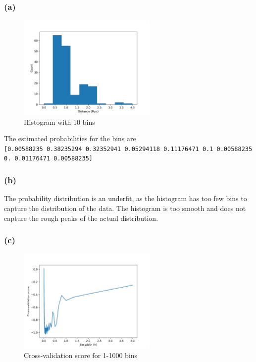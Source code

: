\subsubsection*{(a)}
\vspace{-30pt}
\begin{figure}[H]
	\centering
	\includegraphics[width=0.6\textwidth]{images/10binhistogram.png}
	\caption{Histogram with 10 bins}
\end{figure}
The estimated probabilities for the bins are\\
\texttt{[0.00588235 0.38235294 0.32352941 0.05294118 0.11176471 0.1
			0.00588235 0.         0.01176471 0.00588235]}

\subsubsection*{(b)}
The probability distribution is an underfit, as the histogram has too few bins to capture the distribution of the data. The histogram is too smooth and does not capture the rough peaks of the actual distribution.

\subsubsection*{(c)}
\vspace{-30pt}
\begin{figure}[H]
	\centering
	\includegraphics[width=0.6\textwidth]{images/crossvalidation.png}
	\caption{Cross-validation score for 1-1000 bins}
\end{figure}

